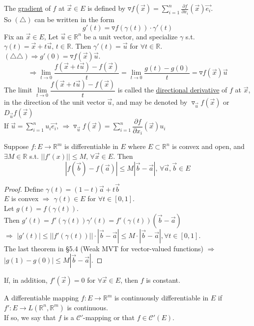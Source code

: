 The \underline{gradient} of   $ f  $ at  $ \vec{x }\in E  $ is defined by  $ \triangledown f(\vec{x})=\sum\limits_{i=1}^{n } \frac{\partial f}{\partial x_i}(\vec{x})\vec{e_i} $.\\
So  $ (\triangle ) $ can be written in the form  \begin{equation}\tag{ $ \triangle \triangle$ }
    g'(t)=\triangledown f(\gamma(t))\cdot\gamma'(t)
\end{equation}
Fix an  $ \vec{x }\in E  $, Let  $ \vec{u } \in \mathbb{R}^n$ be a unit vector, and specialize  $ \gamma  $ s.t.  $ \gamma(t)=\vec{x}+t\vec{u },\,t\in \mathbb{R } $. Then  $ \gamma'(t)=\vec{u } $ for  $ \forall t\in \mathbb{R }  $. $ (\triangle\triangle) \Rightarrow g'(0)=\triangledown f(\vec{x})\vec{u }$.
\[\Rightarrow \lim\limits_{t\to 0 } \dfrac{f(\vec{x}+t\vec{u})-f(\vec{x})}{t}=\lim\limits_{t\to 0 } \dfrac{g(t)-g(0)}{t}= \triangledown f(\vec{x})\vec{u }\tag{ $ \triangle\triangle\triangle $ } \]    
The limit  $ \lim\limits_{t\to 0 } \dfrac{f(\vec{x}+t\vec{u})-f(\vec{x})}{t}  $ is called the \underline{directional derivative} of   $ f  $ at  $ \vec{x } $, in the direction of the unit vector  $ \vec{u } $, and may be denoted by  $ \triangledown_{\vec{u}}f(\vec{x}) $ or  $ D_{\vec{u}}f(\vec{x}) $\\
If  $ \vec{u }=\sum\limits_{i=1}^{n } u_i \vec{e_i } $,  $ \Rightarrow \triangledown_{\vec{u}}f(\vec{x})=\sum\limits_{i=1 }^{n } \dfrac{\partial f }{\partial x_i }(\vec{x})u_i$
\begin{theorem}
    Suppose  $ f:E\rightarrow \mathbb{R}^m  $ is differentiable in  $ E  $ where  $ E\subset \mathbb{R}^n  $ is convex  and open, and  $ \exists M\in \mathbb{R } $ s.t.  $ ||f'(x)|| \leqslant M,\,\forall \vec{x}\in E   $.
    Then \[|f(\vec{b})-f(\vec{a})| \leqslant M|\vec{b}-\vec{a}|,\,\forall \vec{a},\vec{b}\in E  \] 
\end{theorem} 
\begin{proof}
    Define  $ \gamma(t)=(1-t)\vec{a}+t\vec{b} $\\
     $ E  $ is convex  $ \Rightarrow  $  $ \gamma (t)\in E  $ for  $ \forall t\in[0,1] $.\\
     Let  $ g(t)=f(\gamma(t)) $.\\
     Then  $ g'(t)=f'(\gamma(t))\gamma'(t)=f'(\gamma(t))(\vec{b}-\vec{a}) $\\
      $ \Rightarrow $  $ |g'(t)| \leqslant ||f'(\gamma(t))||\cdot|\vec{b}-\vec{a}| \leqslant M\cdot|\vec{b}-\vec{a}|,\forall t\in[0,1] $.\\
      The last theorem in \S 5.4 (Weak MVT for vector-valued functions) $ \Rightarrow $ \\$ |g(1)-g(0)| \leqslant M|\vec{b}-\vec{a}| $.      
\end{proof}  
\begin{corollary}
    If, in addition,  $ f'(\vec{x})=0   $ for  $ \forall \vec{x }\in E   $, then  $ f  $ is constant.  
\end{corollary}     
A differentiable mapping  $ f:E\rightarrow \mathbb{R }^m  $ is continuously differentiable in  $ E $  if  $ f':E\rightarrow L(\mathbb{R}^n,\mathbb{R}^m) $ is continuous.\\
If so, we say that $f $ is a  $ \mathscr{C}' $-mapping or that  $ f\in \mathscr{C}'(E) $.

 